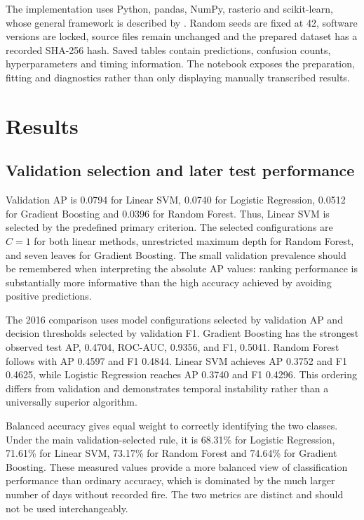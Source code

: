 \documentclass[conference,a4paper]{IEEEtran}
\begin{document}
The implementation uses Python, pandas, NumPy, rasterio and scikit-learn, whose general framework is described by \citet{pedregosa}. Random seeds are fixed at 42, software versions are locked, source files remain unchanged and the prepared dataset has a recorded SHA-256 hash. Saved tables contain predictions, confusion counts, hyperparameters and timing information. The notebook exposes the preparation, fitting and diagnostics rather than only displaying manually transcribed results.

\section{Results}
\subsection{Validation selection and later test performance}
Validation AP is 0.0794 for Linear SVM, 0.0740 for Logistic Regression, 0.0512 for Gradient Boosting and 0.0396 for Random Forest. Thus, Linear SVM is selected by the predefined primary criterion. The selected configurations are $C=1$ for both linear methods, unrestricted maximum depth for Random Forest, and seven leaves for Gradient Boosting. The small validation prevalence should be remembered when interpreting the absolute AP values: ranking performance is substantially more informative than the high accuracy achieved by avoiding positive predictions.

The 2016 comparison uses model configurations selected by validation AP and decision thresholds selected by validation F1. Gradient Boosting has the strongest observed test AP, 0.4704, ROC-AUC, 0.9356, and F1, 0.5041. Random Forest follows with AP 0.4597 and F1 0.4844. Linear SVM achieves AP 0.3752 and F1 0.4625, while Logistic Regression reaches AP 0.3740 and F1 0.4296. This ordering differs from validation and demonstrates temporal instability rather than a universally superior algorithm.


Balanced accuracy gives equal weight to correctly identifying the two classes. Under the main validation-selected rule, it is 68.31\% for Logistic Regression, 71.61\% for Linear SVM, 73.17\% for Random Forest and 74.64\% for Gradient Boosting. These measured values provide a more balanced view of classification performance than ordinary accuracy, which is dominated by the much larger number of days without recorded fire. The two metrics are distinct and should not be used interchangeably.
\end{document}
